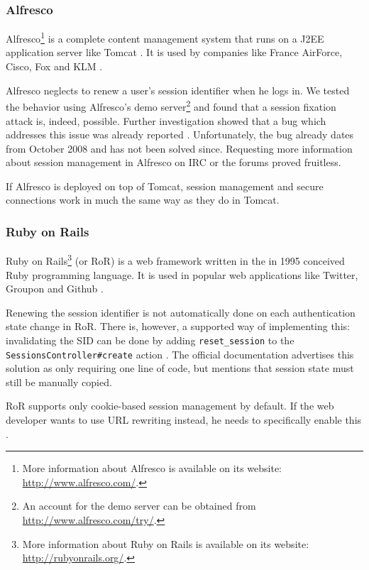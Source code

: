 \subsubsection{Alfresco}

Alfresco\footnote{More information about Alfresco is available on its website: \url{http://www.alfresco.com/}.} is a complete content management system that runs on a J2EE application server like Tomcat \cite{TomcatPoweredBy}. It is used by companies like France AirForce, Cisco, Fox and KLM \cite{AlfrescoPoweredBy}.

Alfresco neglects to renew a user's session identifier when he logs in. We tested the behavior using Alfresco's demo server\footnote{An account for the demo server can be obtained from \url{http://www.alfresco.com/try/}.} and found that a session fixation attack is, indeed, possible. Further investigation showed that a bug which addresses this issue was already reported \cite{AlfrescoSessionFixation}. Unfortunately, the bug already dates from October 2008 and has not been solved since. Requesting more information about session management in Alfresco on IRC or the forums proved fruitless.

If Alfresco is deployed on top of Tomcat, session management and secure connections work in much the same way as they do in Tomcat.

\subsubsection{Ruby on Rails}

Ruby on Rails\footnote{More information about Ruby on Rails is available on its website: \url{http://rubyonrails.org/}.} (or RoR) is a web framework written in the in 1995 conceived Ruby programming language. It is used in popular web applications like Twitter, Groupon and Github \cite{RailsApps}.

Renewing the session identifier is not automatically done on each authentication state change in RoR. There is, however, a supported way of implementing this: invalidating the SID can be done by adding \texttt{reset\_session} to the \texttt{SessionsController\#create} action \cite{Webers2008}. The official documentation advertises this solution as only requiring one line of code, but mentions that session state must still be manually copied.

RoR supports only cookie-based session management by default. If the web developer wants to use URL rewriting instead, he needs to specifically enable this \cite{McMahon2010}.

